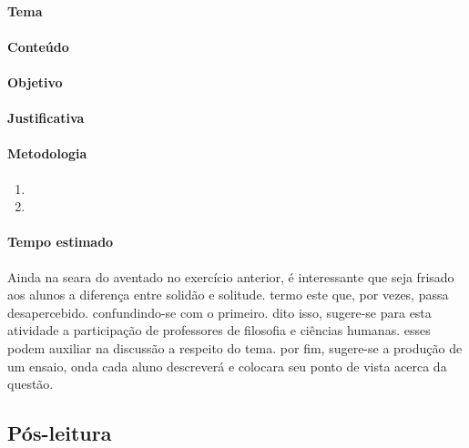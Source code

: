 \documentclass[12pt]{extarticle}
\begin{document}
\paragraph{Tema}

\paragraph{Conteúdo}

\paragraph{Objetivo}

\paragraph{Justificativa}

\paragraph{Metodologia}
\begin{enumerate}
	\item
	\item
\end{enumerate}

\paragraph{Tempo estimado}

Ainda na seara do aventado no exercício anterior, é
interessante que seja frisado aos alunos a diferença entre solidão e
solitude. termo este que, por vezes, passa desapercebido. confundindo-se
com o primeiro. dito isso, sugere-se para esta atividade a participação
de professores de filosofia e ciências humanas. esses podem auxiliar na
discussão a respeito do tema. por fim, sugere-se a produção de um
ensaio, onda cada aluno descreverá e colocara seu ponto de vista acerca
da questão.

\subsection{Pós-leitura}
\end{document}
